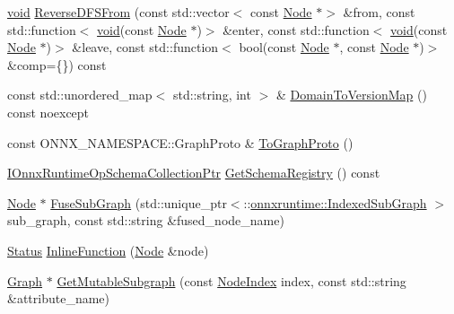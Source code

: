 \begin{DoxyCompactItemize}
\item 
\mbox{\hyperlink{mlasi_8h_a88f941d423cb2a819b70a1358982b1a6}{void}} \mbox{\hyperlink{classonnxruntime_1_1Graph_ab9ff5067db6b6dade2962c9e77cf6591}{Reverse\+D\+F\+S\+From}} (const std\+::vector$<$ const \mbox{\hyperlink{classonnxruntime_1_1Node}{Node}} $\ast$$>$ \&from, const std\+::function$<$ \mbox{\hyperlink{mlasi_8h_a88f941d423cb2a819b70a1358982b1a6}{void}}(const \mbox{\hyperlink{classonnxruntime_1_1Node}{Node}} $\ast$)$>$ \&enter, const std\+::function$<$ \mbox{\hyperlink{mlasi_8h_a88f941d423cb2a819b70a1358982b1a6}{void}}(const \mbox{\hyperlink{classonnxruntime_1_1Node}{Node}} $\ast$)$>$ \&leave, const std\+::function$<$ bool(const \mbox{\hyperlink{classonnxruntime_1_1Node}{Node}} $\ast$, const \mbox{\hyperlink{classonnxruntime_1_1Node}{Node}} $\ast$)$>$ \&comp=\{\}) const
\item 
const std\+::unordered\+\_\+map$<$ std\+::string, int $>$ \& \mbox{\hyperlink{classonnxruntime_1_1Graph_a46d1e58cbb0615f3e9733f15fb7aa1cc}{Domain\+To\+Version\+Map}} () const noexcept
\item 
const O\+N\+N\+X\+\_\+\+N\+A\+M\+E\+S\+P\+A\+C\+E\+::\+Graph\+Proto \& \mbox{\hyperlink{classonnxruntime_1_1Graph_a9fdaa2f3924b5b06a2a6cda0821d9d6a}{To\+Graph\+Proto}} ()
\item 
\mbox{\hyperlink{namespaceonnxruntime_af9a8d0a11a8e0ccd714c7ddc2fabe41d}{I\+Onnx\+Runtime\+Op\+Schema\+Collection\+Ptr}} \mbox{\hyperlink{classonnxruntime_1_1Graph_a75e0404bbe9fbd90955553ecdf777cbe}{Get\+Schema\+Registry}} () const
\item 
\mbox{\hyperlink{classonnxruntime_1_1Node}{Node}} $\ast$ \mbox{\hyperlink{classonnxruntime_1_1Graph_a4d09a87a881969281aaca973ec5bebd4}{Fuse\+Sub\+Graph}} (std\+::unique\+\_\+ptr$<$\+::\mbox{\hyperlink{structonnxruntime_1_1IndexedSubGraph}{onnxruntime\+::\+Indexed\+Sub\+Graph}} $>$ sub\+\_\+graph, const std\+::string \&fused\+\_\+node\+\_\+name)
\item 
\mbox{\hyperlink{classonnxruntime_1_1common_1_1Status}{Status}} \mbox{\hyperlink{classonnxruntime_1_1Graph_a16939133ef7de183b66adf88dc948657}{Inline\+Function}} (\mbox{\hyperlink{classonnxruntime_1_1Node}{Node}} \&node)
\item 
\mbox{\hyperlink{classonnxruntime_1_1Graph}{Graph}} $\ast$ \mbox{\hyperlink{classonnxruntime_1_1Graph_a6627ca765d7547bcd1e5fca2cd53233e}{Get\+Mutable\+Subgraph}} (const \mbox{\hyperlink{namespaceonnxruntime_af8773b5c12b5d8fd9292eb2e268df760}{Node\+Index}} index, const std\+::string \&attribute\+\_\+name)
\item 
$$
\end{DoxyCompactItemize}
